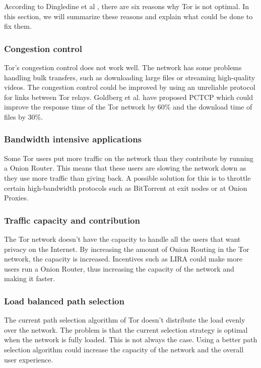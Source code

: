 \documentclass{article}
\begin{document}
		According to Dingledine et al \cite{dingledine2009performance}, there are six reasons why Tor is not optimal. In this section, we will summarize these reasons and explain what could be done to fix them.
		
		\subsubsection{Congestion control}
		Tor's congestion control does not work well. The network has some problems handling bulk transfers, such as downloading large files or streaming high-quality videos. The congestion control could be improved by using an unreliable protocol for links between Tor relays. Goldberg et al. \cite{alsabah2013pctcp} have proposed PCTCP which could improve the response time of the Tor network by 60\% and the download time of files by 30\%.	
		
		\subsubsection{Bandwidth intensive applications}
		Some Tor users put more traffic on the network than they contribute by running a Onion Router. This means that these users are slowing the network down as they use more traffic than giving back. A possible solution for this is to throttle certain high-bandwidth protocols such as BitTorrent at exit nodes or at Onion Proxies.
		
		\subsubsection{Traffic capacity and contribution}
		The Tor network doesn't have the capacity to handle all the users that want privacy on the Internet. By increasing the amount of Onion Routing in the Tor network, the capacity is increased. Incentives such as LIRA \cite{jansen13lira} could make more users run a Onion Router, thus increasing the capacity of the network and making it faster.		
		
		\subsubsection{Load balanced path selection}
		The current path selection algorithm of Tor doesn't distribute the load evenly over the network. The problem is that the current selection strategy is optimal when the network is fully loaded. This is not always the case. Using a better path selection algorithm could increase the capacity of the network and the overall user experience.		
		
\end{document}
